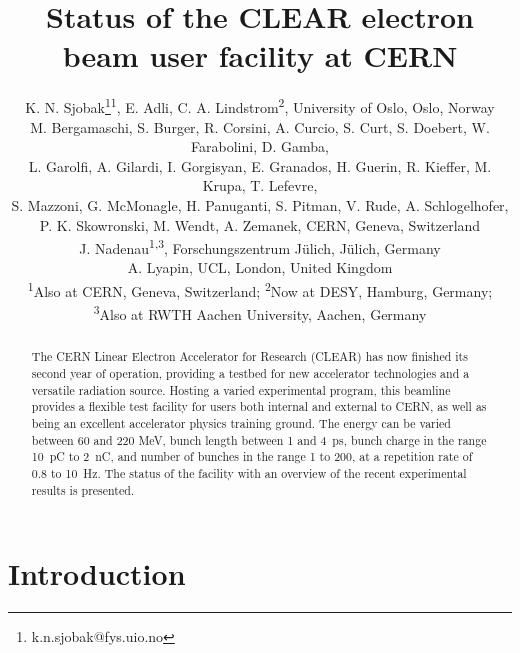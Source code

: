 \documentclass[a4paper,
               keeplastbox,   %
               ]{jacow}
\begin{document}
\title{Status of the CLEAR electron beam user facility at CERN}

\author{K. N. Sjobak\thanks{k.n.sjobak@fys.uio.no}\textsuperscript{1}, E. Adli, C. A. Lindstrom\textsuperscript{2}, University of Oslo, Oslo, Norway\\
  M. Bergamaschi, S. Burger, R. Corsini, A. Curcio, S. Curt, S. Doebert, W. Farabolini, D. Gamba,\\
  L. Garolfi, A. Gilardi, I. Gorgisyan, E. Granados, H. Guerin, R. Kieffer, M. Krupa, T. Lefevre,\\
  S. Mazzoni, G. McMonagle, H. Panuganti, S. Pitman, V. Rude, A. Schlogelhofer,\\
  P. K. Skowronski, M. Wendt, A. Zemanek, CERN, Geneva, Switzerland \\
  J. Nadenau\textsuperscript{1,3}, Forschungszentrum J\"ulich, J\"ulich, Germany\\
  A. Lyapin, UCL, London, United Kingdom \\
  \textsuperscript{1}Also at CERN, Geneva, Switzerland; \textsuperscript{2}Now at DESY, Hamburg, Germany;\\
  \textsuperscript{3}Also at RWTH Aachen University, Aachen, Germany
}
\maketitle

%
\begin{abstract}
  The CERN Linear Electron Accelerator for Research (CLEAR)  has now finished its second year of operation, providing a testbed for new accelerator technologies and a versatile radiation source.
  Hosting a varied experimental program, this beamline provides a flexible test facility for users both internal and external to CERN, as well as being an excellent accelerator physics training ground.
  The energy can be varied between 60 and 220 MeV, bunch length between 1 and 4~ps, bunch charge in the range 10~pC to 2~nC, and number of bunches in the range 1 to 200, at a repetition rate of 0.8 to 10~Hz.
  The status of the facility with an overview of the recent experimental results is presented.
\end{abstract}

\section{Introduction}
\end{document}
